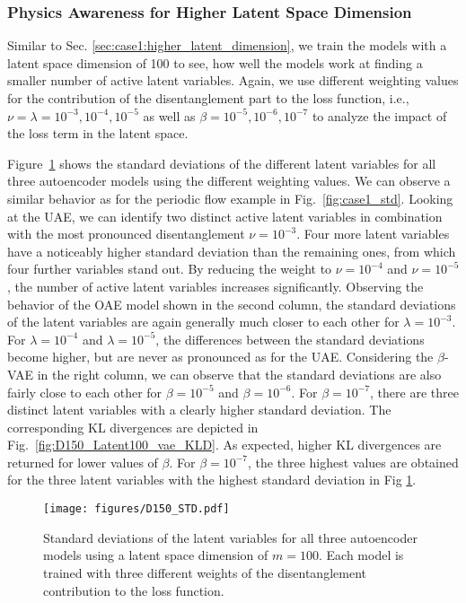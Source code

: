\subsubsection{Physics Awareness for Higher Latent Space Dimension}
Similar to Sec. \ref{sec:case1:higher_latent_dimension}, 
we train the models with a latent space dimension of 100 to see, how well the models work at finding a smaller number of active latent variables. Again, we use different weighting values for the contribution of the disentanglement part to the loss function, i.e., $\nu = \lambda = 10^{-3}, 10^{-4}, 10^{-5}$ as well as $\beta = 10^{-5}, 10^{-6}, 10^{-7}$ to analyze the impact of the loss term in the latent space. 


Figure~\ref{fig:D150_std} shows the standard deviations of the different latent variables for all three autoencoder models using the different weighting values. We can observe a similar behavior as for the periodic flow example in Fig.~\ref{fig:case1_std}. Looking at the UAE, we can identify two distinct active latent variables in combination with the most pronounced disentanglement $\nu=10^{-3}$. Four more latent variables have a noticeably higher standard deviation than the remaining ones, from which four further variables stand out. By reducing the weight to $\nu=10^{-4}$ and $\nu=10^{-5}$, the number of active latent variables increases significantly. 
%
Observing the behavior of the OAE model shown in the second column, the standard deviations of the latent variables are again generally much closer to each other for $\lambda=10^{-3}$. For $\lambda=10^{-4}$ and $\lambda=10^{-5}$, the differences between the standard deviations become higher, but are never  as pronounced as for the UAE. 
%
Considering the $\beta$-VAE in the right column, we can observe that the standard deviations are also fairly close to each other for $\beta=10^{-5}$ and $\beta=10^{-6}$. For $\beta=10^{-7}$, there are three distinct latent variables with a clearly higher standard deviation.  
The corresponding KL divergences are depicted in Fig.~\ref{fig:D150_Latent100_vae_KLD}. As expected, higher KL divergences are returned for lower values of $\beta$. For $\beta=10^{-7}$, the three highest values are obtained for the three latent variables with the highest standard deviation in Fig \ref{fig:D150_std}. 


\begin{figure}[h!]
    \centering
    \texttt{[image: figures/D150\_STD.pdf]}
    \caption{Standard deviations of the latent variables for all three autoencoder models using a latent space dimension of $m=100$. Each model is trained with three different weights of the disentanglement
contribution to the loss function.}
    \label{fig:D150_std}
\end{figure}

